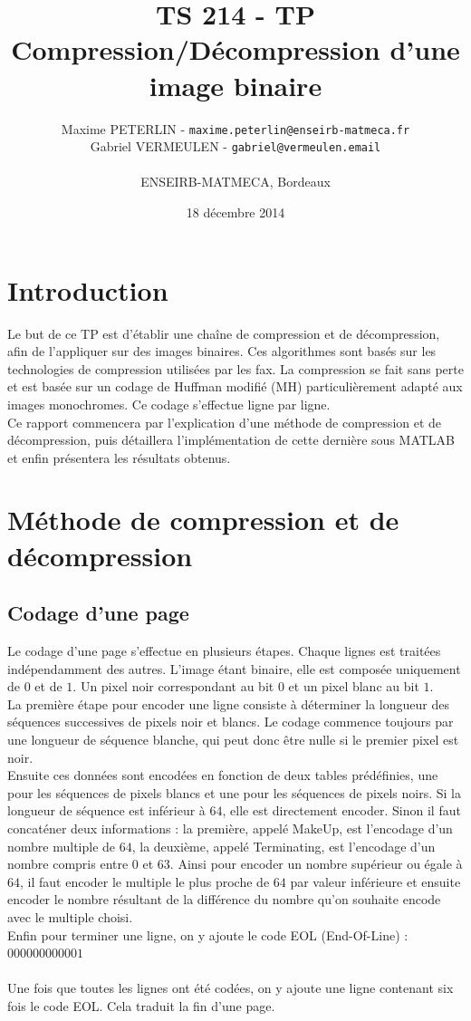 \documentclass[11pt]{article}
\title{\textbf{TS 214 - TP}\\Compression/Décompression d'une image binaire}
\author{Maxime PETERLIN - \texttt{maxime.peterlin@enseirb-matmeca.fr}\\
Gabriel VERMEULEN - \texttt{gabriel@vermeulen.email} \\\\{ENSEIRB-MATMECA, Bordeaux}}
\date{18 décembre 2014}
\begin{document}
\maketitle
\tableofcontents

\newpage

\section{Introduction}

	Le but de ce TP est d'établir une chaîne de compression et de décompression, afin de l'appliquer sur des images binaires. Ces algorithmes sont basés sur les technologies de compression utilisées par les fax. La compression se fait sans perte et est basée sur un codage de Huffman modifié (MH) particulièrement adapté aux images monochromes. Ce codage s'effectue ligne par ligne.\\
	Ce rapport commencera par l’explication d'une méthode de compression et de décompression, puis détaillera l'implémentation de cette dernière sous MATLAB et enfin présentera les résultats obtenus.

\section{Méthode de compression et de décompression}

	\subsection{Codage d'une page}
	
	Le codage d'une page s'effectue en plusieurs étapes. Chaque lignes est traitées indépendamment des autres. L'image étant binaire, elle est composée uniquement de $0$ et de $1$. Un pixel noir correspondant au bit $0$ et un pixel blanc au bit $1$.\\
	La première étape pour encoder une ligne consiste à déterminer la longueur des séquences successives de pixels noir et blancs. Le codage commence toujours par une longueur de séquence blanche, qui peut donc être nulle si le premier pixel est noir.\\
	Ensuite ces données sont encodées en fonction de deux tables prédéfinies, une pour les séquences de pixels blancs et une pour les séquences de pixels noirs. Si la longueur de séquence est inférieur à $64$, elle est directement encoder. Sinon il faut concaténer deux informations : la première, appelé MakeUp, est l'encodage d'un nombre multiple de $64$, la deuxième, appelé Terminating, est l'encodage d'un nombre compris entre $0$ et $63$. Ainsi pour encoder un nombre supérieur ou égale à $64$, il faut encoder le multiple le plus proche de $64$ par valeur inférieure et ensuite encoder le nombre résultant de la différence du nombre qu'on souhaite encode avec le multiple choisi.\\
	Enfin pour terminer une ligne, on y ajoute le code EOL (End-Of-Line) : $000000000001$\\\\
	Une fois que toutes les lignes ont été codées, on y ajoute une ligne contenant six fois le code EOL. Cela traduit la fin d'une page.
	
\end{document}
